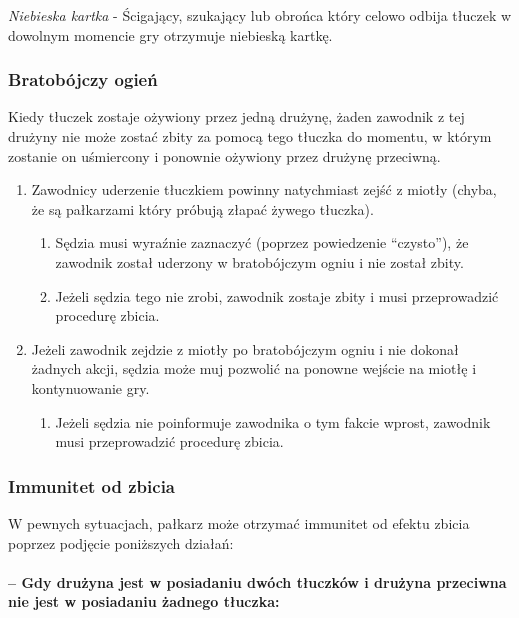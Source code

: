 \documentclass[12pt]{article}
\begin{document}
\emph{Niebieska kartka} - Ścigający, szukający lub obrońca który celowo
odbija tłuczek w dowolnym momencie gry otrzymuje niebieską kartkę.

\subsubsection{Bratobójczy ogień}

Kiedy tłuczek zostaje ożywiony przez jedną drużynę, żaden zawodnik z tej
drużyny nie może zostać zbity za pomocą tego tłuczka do momentu, w
którym zostanie on uśmiercony i ponownie ożywiony przez drużynę
przeciwną.

\begin{enumerate}
\item
    Zawodnicy uderzenie tłuczkiem powinny natychmiast zejść z miotły
  (chyba, że są pałkarzami który próbują złapać żywego tłuczka).
  
  \begin{enumerate}
  \item
        Sędzia musi wyraźnie zaznaczyć (poprzez powiedzenie ``czysto''), że
    zawodnik został uderzony w bratobójczym ogniu i nie został zbity.
      \item
        Jeżeli sędzia tego nie zrobi, zawodnik zostaje zbity i musi
    przeprowadzić procedurę zbicia.
      \end{enumerate}
\item
    Jeżeli zawodnik zejdzie z miotły po bratobójczym ogniu i nie dokonał
  żadnych akcji, sędzia może muj pozwolić na ponowne wejście na miotłę i
  kontynuowanie gry.
  
  \begin{enumerate}
  \item
        Jeżeli sędzia nie poinformuje zawodnika o tym fakcie wprost,
    zawodnik musi przeprowadzić procedurę zbicia.
      \end{enumerate}
\end{enumerate}

\subsubsection{Immunitet od zbicia}

W pewnych sytuacjach, pałkarz może otrzymać immunitet od efektu zbicia
poprzez podjęcie poniższych działań:

\paragraph{-- Gdy drużyna jest w posiadaniu dwóch tłuczków i
drużyna przeciwna nie jest w posiadaniu żadnego tłuczka:}
\end{document}
